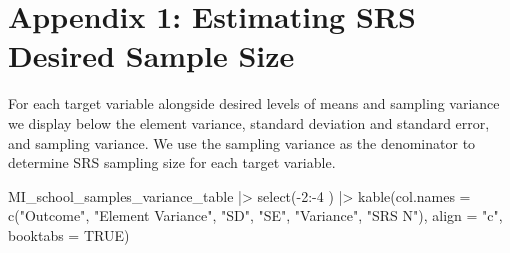\documentclass[
  12pt]{article}
\newenvironment{Shaded}{\begin{snugshade}}{\end{snugshade}}
\newcommand{\AttributeTok}[1]{\textcolor[rgb]{0.40,0.45,0.13}{#1}}
\newcommand{\ConstantTok}[1]{\textcolor[rgb]{0.56,0.35,0.01}{#1}}
\newcommand{\DecValTok}[1]{\textcolor[rgb]{0.68,0.00,0.00}{#1}}
\newcommand{\FunctionTok}[1]{\textcolor[rgb]{0.28,0.35,0.67}{#1}}
\newcommand{\NormalTok}[1]{\textcolor[rgb]{0.00,0.23,0.31}{#1}}
\newcommand{\SpecialCharTok}[1]{\textcolor[rgb]{0.37,0.37,0.37}{#1}}
\newcommand{\StringTok}[1]{\textcolor[rgb]{0.13,0.47,0.30}{#1}}
\begin{document}
\newpage

\section{Appendix 1: Estimating SRS Desired Sample
Size}\label{appendix-1-estimating-srs-desired-sample-size}

For each target variable alongside desired levels of means and sampling
variance we display below the element variance, standard deviation and
standard error, and sampling variance. We use the sampling variance as
the denominator to determine SRS sampling size for each target variable.

\begin{Shaded}
\begin{Highlighting}[]
\NormalTok{MI\_school\_samples\_variance\_table }\SpecialCharTok{|\textgreater{}} 
  \FunctionTok{select}\NormalTok{(}\SpecialCharTok{{-}}\DecValTok{2}\SpecialCharTok{:{-}}\DecValTok{4}\NormalTok{ ) }\SpecialCharTok{|\textgreater{}} 
  \FunctionTok{kable}\NormalTok{(}\AttributeTok{col.names =} \FunctionTok{c}\NormalTok{(}\StringTok{"Outcome"}\NormalTok{, }\StringTok{"Element Variance"}\NormalTok{, }\StringTok{"SD"}\NormalTok{, }\StringTok{"SE"}\NormalTok{, }\StringTok{"Variance"}\NormalTok{, }
                      \StringTok{"SRS N"}\NormalTok{),  }
        \AttributeTok{align =} \StringTok{"c"}\NormalTok{, }\AttributeTok{booktabs =} \ConstantTok{TRUE}\NormalTok{) }
\end{Highlighting}
\end{Shaded}
\end{document}
